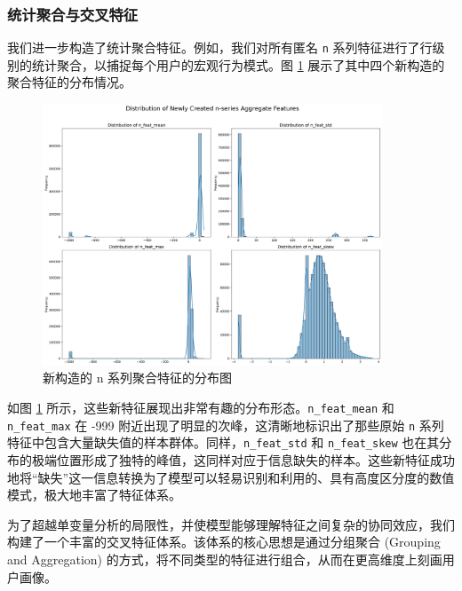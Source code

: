 \documentclass{thuemp}
\begin{document}
\subsubsection{统计聚合与交叉特征}

我们进一步构造了统计聚合特征。例如，我们对所有匿名 \texttt{n} 系列特征进行了行级别的统计聚合，以捕捉每个用户的宏观行为模式。图 \ref{fig:n_agg_dist} 展示了其中四个新构造的聚合特征的分布情况。

\begin{figure}[H]
    \centering
    \includegraphics[width=0.9\textwidth]{image/results/images/n-series.png} %
    \caption{新构造的 n 系列聚合特征的分布图}
    \label{fig:n_agg_dist}
\end{figure}


如图 \ref{fig:n_agg_dist} 所示，这些新特征展现出非常有趣的分布形态。\texttt{n\_feat\_mean} 和 \texttt{n\_feat\_max} 在 -999 附近出现了明显的次峰，这清晰地标识出了那些原始 \texttt{n} 系列特征中包含大量缺失值的样本群体。同样，\texttt{n\_feat\_std} 和 \texttt{n\_feat\_skew} 也在其分布的极端位置形成了独特的峰值，这同样对应于信息缺失的样本。这些新特征成功地将“缺失”这一信息转换为了模型可以轻易识别和利用的、具有高度区分度的数值模式，极大地丰富了特征体系。


为了超越单变量分析的局限性，并使模型能够理解特征之间复杂的协同效应，我们构建了一个丰富的交叉特征体系。该体系的核心思想是通过分组聚合 (Grouping and Aggregation) 的方式，将不同类型的特征进行组合，从而在更高维度上刻画用户画像。
\end{document}
